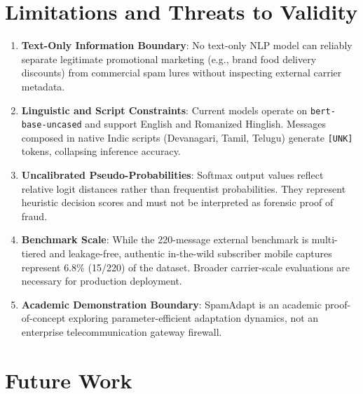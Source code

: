 \documentclass[conference]{IEEEtran}
\begin{document}
\section{Limitations and Threats to Validity}
\label{sec:limitations}

\begin{enumerate}
    \item \textbf{Text-Only Information Boundary}: No text-only NLP model can reliably separate legitimate promotional marketing (e.g., brand food delivery discounts) from commercial spam lures without inspecting external carrier metadata.
    \item \textbf{Linguistic and Script Constraints}: Current models operate on \texttt{bert-base-uncased} and support English and Romanized Hinglish. Messages composed in native Indic scripts (Devanagari, Tamil, Telugu) generate \texttt{[UNK]} tokens, collapsing inference accuracy.
    \item \textbf{Uncalibrated Pseudo-Probabilities}: Softmax output values reflect relative logit distances rather than frequentist probabilities. They represent heuristic decision scores and must not be interpreted as forensic proof of fraud.
    \item \textbf{Benchmark Scale}: While the 220-message external benchmark is multi-tiered and leakage-free, authentic in-the-wild subscriber mobile captures represent 6.8\% (15/220) of the dataset. Broader carrier-scale evaluations are necessary for production deployment.
    \item \textbf{Academic Demonstration Boundary}: SpamAdapt is an academic proof-of-concept exploring parameter-efficient adaptation dynamics, not an enterprise telecommunication gateway firewall.
\end{enumerate}

\section{Future Work}
\label{sec:future_work}
\end{document}
